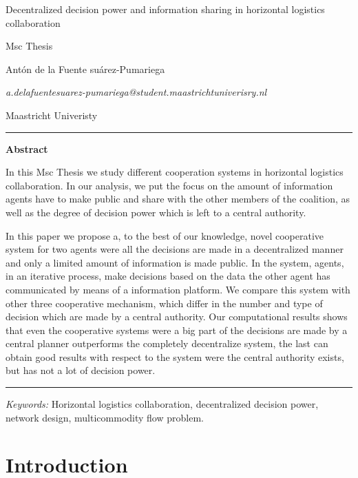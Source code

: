 \documentclass{article}
\begin{document}

\begin{center}

{\Large Decentralized decision power and information sharing in horizontal logistics collaboration} \\\medskip

Msc Thesis
\bigskip

Antón de la Fuente suárez-Pumariega
\medskip

\textit{a.delafuentesuarez-pumariega@student.maastrichtuniverisry.nl}
\bigskip

Maastricht Univeristy
\end{center}
\vspace{1cm}

\hrule
\medskip


\noindent\textbf{Abstract}
\medskip

\noindent In this Msc Thesis we study different cooperation systems in horizontal logistics collaboration. In our analysis, we put the focus on the amount of information agents have to make public and share with the other members of the coalition, as well as the degree of decision power which is left to a central authority. 

In this paper we propose a, to the best of our knowledge, novel cooperative system for two agents were all the decisions are made in a decentralized manner and only a limited amount of information is made public. In the system, agents, in an iterative process, make decisions based on the data the other agent has communicated by means of a information platform. We compare this system with other three cooperative mechanism, which differ in the number and type of decision which are made by a central authority. Our computational results shows that even the cooperative systems were a big part of the decisions are made by a central planner outperforms the completely decentralize system, the last can obtain good results with respect to the system were the central authority exists, but has not a lot of decision power.


\bigskip
\hrule
\bigskip

\textit{Keywords:} Horizontal logistics collaboration, decentralized decision power, network design, multicommodity flow problem.

\section{Introduction}
\end{document}

